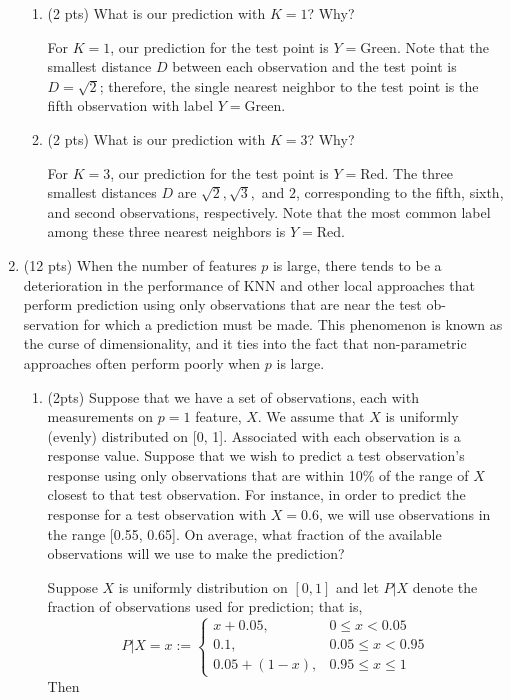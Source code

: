 \documentclass[a4paper]{article}
\theoremstyle{definition}
\newenvironment{soln}{
    \leavevmode\color{blue}\ignorespaces
}{}
\begin{document}
\begin{enumerate}
\begin{enumerate}
	\item (2 pts) What is our prediction with $K=1$? Why?
	
	\begin{soln}  For $K=1$, our prediction for the test point is $Y = \text{Green}$. Note that the smallest distance $D$ between each observation and the test point is $D = \sqrt{2}$; therefore, the single nearest neighbor to the test point is the fifth observation with label $Y = \text{Green}$. \end{soln}

	\medskip

	\item (2 pts) What is our prediction with $K=3$? Why?
	
	\begin{soln}  For $K=3$, our prediction for the test point is $Y = \text{Red}$. The three smallest distances $D$ are $\sqrt{2}, \sqrt{3},$ and $2$, corresponding to the fifth, sixth, and second observations, respectively. Note that the most common label among these three nearest neighbors is $Y = \text{Red}$. \end{soln}

	\medskip

\end{enumerate}

\item (12 pts) When the number of features $p$ is large, there tends to be a deterioration in the performance of KNN and other local approaches that perform prediction using only observations that are near the test ob- servation for which a prediction must be made. This phenomenon is known as the curse of dimensionality, and it ties into the fact that non-parametric approaches often perform poorly when $p$ is large.

\begin{enumerate}
	\item (2pts) Suppose that we have a set of observations, each with measurements on $p=1$ feature, $X$. We assume that $X$ is uniformly (evenly) distributed on [0, 1]. Associated with each observation is a response value. Suppose that we wish to predict a test observation’s response using only observations that are within 10\% of the range of $X$ closest to that test observation. For instance, in order to predict the response for a test observation with $X=0.6$, we will use observations in the range [0.55, 0.65]. On average, what fraction of the available observations will we use to make the prediction?
	
	\begin{soln} Suppose $X$ is uniformly distribution on $[0, 1]$ and let $P | X$ denote the fraction of observations used for prediction; that is, 
		$$P|X=x :=\begin{cases}
			x + 0.05, & 0 \leq x < 0.05\\
			0.1, & 0.05 \leq x < 0.95 \\
			0.05 + (1 - x), & 0.95 \leq x \leq 1
	\end{cases}$$ Then
		

\end{soln}
\end{enumerate}
\end{enumerate}
\end{document}
